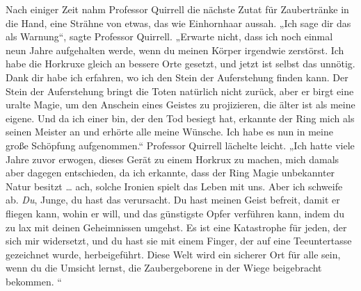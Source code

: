 Nach einiger Zeit nahm Professor Quirrell die nächste Zutat für Zaubertränke in die Hand, eine Strähne von etwas, das wie Einhornhaar aussah.
„Ich sage dir das als Warnung“, sagte Professor Quirrell.
„Erwarte nicht, dass ich noch einmal neun Jahre aufgehalten werde, wenn du meinen Körper irgendwie zerstörst. Ich habe die Horkruxe gleich an bessere Orte gesetzt, und jetzt ist selbst das unnötig. Dank dir habe ich erfahren, wo ich den Stein der Auferstehung finden kann. Der Stein der Auferstehung bringt die Toten natürlich nicht zurück, aber er birgt eine uralte Magie, um den Anschein eines Geistes zu projizieren, die älter ist als meine eigene. Und da ich einer bin, der den Tod besiegt hat, erkannte der Ring mich als seinen Meister an und erhörte alle meine Wünsche. Ich habe es nun in meine große Schöpfung aufgenommen.“
Professor Quirrell lächelte leicht.
„Ich hatte viele Jahre zuvor erwogen, dieses Gerät zu einem Horkrux zu machen, mich damals aber dagegen entschieden, da ich erkannte, dass der Ring Magie unbekannter Natur besitzt … ach, solche Ironien spielt das Leben mit uns. Aber ich schweife ab. \emph{Du}, Junge, du hast das verursacht. Du hast meinen Geist befreit, damit er fliegen kann, wohin er will, und das günstigste Opfer verführen kann, indem du zu lax mit deinen Geheimnissen umgehst. Es ist eine Katastrophe für jeden, der sich mir widersetzt, und du hast sie mit einem Finger, der auf eine Teeuntertasse gezeichnet wurde, herbeigeführt. Diese Welt wird ein sicherer Ort für alle sein, wenn du die Umsicht lernst, die Zaubergeborene in der Wiege beigebracht bekommen. “

